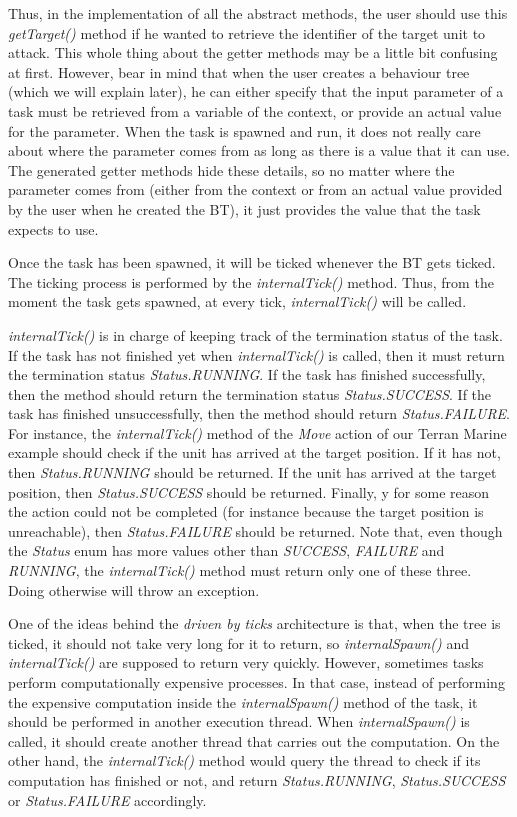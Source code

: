 \documentclass[a4paper]{article}
\begin{document}
Thus, in the implementation of all the abstract methods, the user should use this \textit{getTarget()} method if he wanted to retrieve the identifier of the target unit to attack. This whole thing about the getter methods may be a little bit confusing at first. However, bear in mind that when the user creates a behaviour tree (which we will explain later), he can either specify that the input parameter of a task must be retrieved from a variable of the context, or provide an actual value for the parameter. When the task is spawned and run, it does not really care about where the parameter comes from as long as there is a value that it can use. The generated getter methods hide these details, so no matter where the parameter comes from (either from the context or from an actual value provided by the user when he created the BT), it just provides the value that the task expects to use.

Once the task has been spawned, it will be ticked whenever the BT gets ticked. The ticking process is performed by the \textit{internalTick()} method. Thus, from the moment the task gets spawned, at every tick, \textit{internalTick()} will be called. 

\textit{internalTick()} is in charge of keeping track of the termination status of the task. If the task has not finished yet when \textit{internalTick()} is called, then it must return the termination status \textit{Status.RUNNING}. If the task has finished successfully, then the method should return the termination status \textit{Status.SUCCESS}. If the task has finished unsuccessfully, then the method should return \textit{Status.FAILURE}. For instance, the \textit{internalTick()} method of the \textit{Move} action of our Terran Marine example should check if the unit has arrived at the target position. If it has not, then \textit{Status.RUNNING} should be returned. If the unit has arrived at the target position, then \textit{Status.SUCCESS} should be returned. Finally, y for some reason the action could not be completed (for instance because the target position is unreachable), then \textit{Status.FAILURE} should be returned. Note that, even though the \textit{Status} enum has more values other than \textit{SUCCESS}, \textit{FAILURE} and \textit{RUNNING}, the \textit{internalTick()} method must return only one of these three. Doing otherwise will throw an exception.

One of the ideas behind the \textit{driven by ticks} architecture is that, when the tree is ticked, it should not take very long for it to return, so \textit{internalSpawn()} and \textit{internalTick()} are supposed to return very quickly. However, sometimes tasks perform computationally expensive processes. In that case, instead of performing the expensive computation inside the \textit{internalSpawn()} method of the task, it should be performed in another execution thread. When \textit{internalSpawn()} is called, it should create another thread that carries out the computation. On the other hand, the \textit{internalTick()} method would query the thread to check if its computation has finished or not, and return \textit{Status.RUNNING}, \textit{Status.SUCCESS} or \textit{Status.FAILURE} accordingly.
\end{document}
